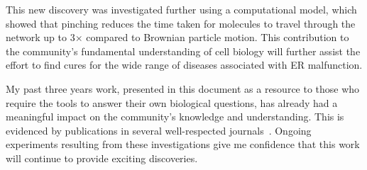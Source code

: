 This new discovery was investigated further using a computational model, which showed that pinching reduces the time taken for molecules to travel through the network up to 3$\times$ compared to Brownian particle motion. 
This contribution to the community's fundamental understanding of cell biology will further assist the effort to find cures for the wide range of diseases associated with ER malfunction.

My past three years work, presented in this document as a resource to those who require the tools to answer their own biological questions, has already had a meaningful impact on the community's knowledge and understanding.
This is evidenced by publications in several well-respected journals~\cite{teplensky2017temperature, fantham2017new, moghadam2018computer, holcman2018single, lautenschlager2018c}. 
Ongoing experiments resulting from these investigations give me confidence that this work will continue to provide exciting discoveries. 

